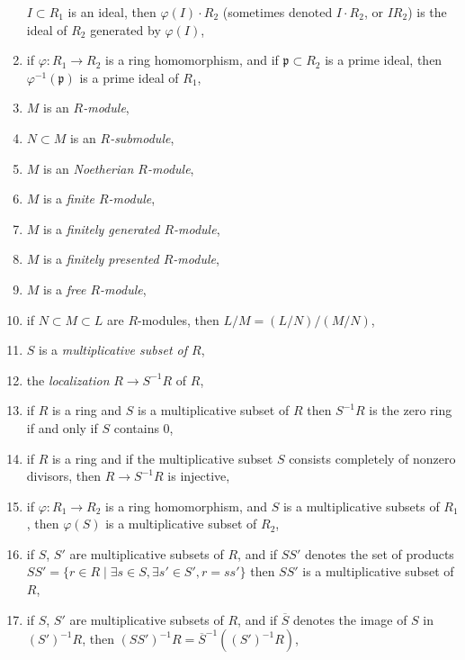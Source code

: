 \begin{enumerate}
$I \subset R_1$ is an ideal, then $\varphi(I) \cdot R_2$ (sometimes
denoted $I \cdot R_2$, or $IR_2$) is the ideal of $R_2$ generated
by $\varphi(I)$,
\label{image-ideal}
\item if $\varphi : R_1 \to R_2$ is a ring homomorphism, and if
$\mathfrak p \subset R_2$ is a prime ideal, then
$\varphi^{-1}(\mathfrak p)$ is a prime ideal of $R_1$,
\label{inverse-image-prime}
\item $M$ is an {\it $R$-module},
\label{module}
\item $N \subset M$ is an {\it $R$-submodule},
\label{submodule}
\item $M$ is an {\it Noetherian $R$-module},
\label{Noetherian-module}
\item $M$ is a {\it finite $R$-module},
\label{finite-module}
\item $M$ is a {\it finitely generated $R$-module},
\label{finitely-generated-module}
\item $M$ is a {\it finitely presented $R$-module},
\label{finitely-presented-module}
\item $M$ is a {\it free $R$-module},
\label{free-module}
\item if $N \subset M \subset L$ are $R$-modules,
then $L/M = (L/N)/(M/N)$,
\label{isomorphism-theorem}
\item $S$ is a {\it multiplicative subset of $R$},
\label{multiplicative-subset}
\item the {\it localization} $R \to S^{-1}R$ of $R$,
\label{localization-ring}
\item if $R$ is a ring and $S$ is a multiplicative subset
of $R$ then $S^{-1}R$ is the zero ring if and only if $S$ contains
$0$,
\label{localization-zero}
\item if $R$ is a ring and if the multiplicative subset $S$
consists completely of nonzero divisors, then $R \to S^{-1}R$
is injective,
\label{localize-nonzerodivisors}
\item if $\varphi : R_1 \to R_2$ is a ring homomorphism, and
$S$ is a multiplicative subsets of $R_1$, then $\varphi(S)$ is
a multiplicative subset of $R_2$,
\item if $S$, $S'$ are multiplicative subsets of $R$,
and if $SS'$ denotes the set of products $SS' =
\{r \in R \mid \exists s\in S, \exists s' \in S', r = ss'\}$
then $SS'$ is a multiplicative subset of $R$,
\label{products-multiplicative-subsets}
\item if $S$, $S'$ are multiplicative subsets of $R$,
and if $\overline{S}$ denotes the image of $S$ in $(S')^{-1}R$,
then $(SS')^{-1}R = \overline{S}^{-1}((S')^{-1}R)$,

\end{enumerate}

